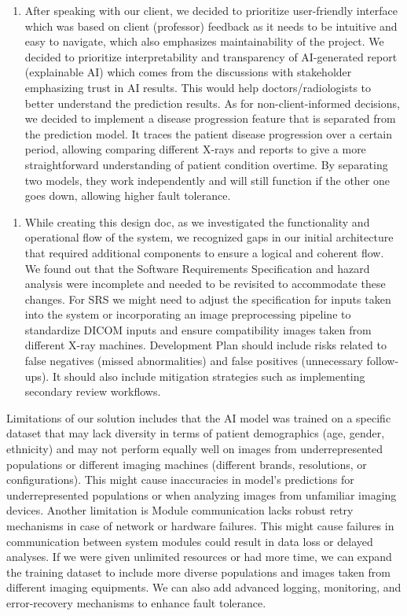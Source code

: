 \documentclass[12pt, titlepage]{article}
\begin{document}
\begin{enumerate}
  \item After speaking with our client, we decided to prioritize user-friendly interface which was based on client (professor) feedback as it needs to be intuitive and easy to navigate, which also emphasizes maintainability of the project. We decided to prioritize interpretability and transparency of AI-generated report (explainable AI) which comes from the discussions with stakeholder emphasizing trust in AI results. This would help doctors/radiologists to better understand the prediction results. As for non-client-informed decisions, we decided to implement a disease progression feature that is separated from the prediction model. It traces the patient disease progression over a certain period, allowing comparing different X-rays and reports to give a more straightforward understanding of patient condition overtime. By separating two models, they work independently and will still function if the other one goes down, allowing higher fault tolerance.
\end{enumerate}

\begin{enumerate}
  \item While creating this design doc, as we investigated the functionality and operational flow of the system, we recognized gaps in our initial architecture that required additional components to ensure a logical and coherent flow. We found out that the Software Requirements Specification and hazard analysis were incomplete and needed to be revisited to accommodate these changes. For SRS we might need to adjust the specification for inputs taken into the system or incorporating an image preprocessing pipeline to standardize DICOM inputs and ensure compatibility images taken from different X-ray machines. Development Plan should include risks related to false negatives (missed abnormalities) and false positives (unnecessary follow-ups). It should also include mitigation strategies such as implementing secondary review workflows. 
\end{enumerate}

\begin{enumerate}
  Limitations of our solution includes that the AI model was trained on a specific dataset that may lack diversity in terms of patient demographics (age, gender, ethnicity) and may not perform equally well on images from underrepresented populations or different imaging machines (different brands, resolutions, or configurations). This might cause inaccuracies in model's predictions for underrepresented populations or when analyzing images from unfamiliar imaging devices. Another limitation is Module communication lacks robust retry mechanisms in case of network or hardware failures. This might cause failures in communication between system modules could result in data loss or delayed analyses. If we were given unlimited resources or had more time, we can expand the training dataset to include more diverse populations and images taken from different imaging equipments. We can also add advanced logging, monitoring, and error-recovery mechanisms to enhance fault tolerance. 
\end{enumerate}
\end{document}
